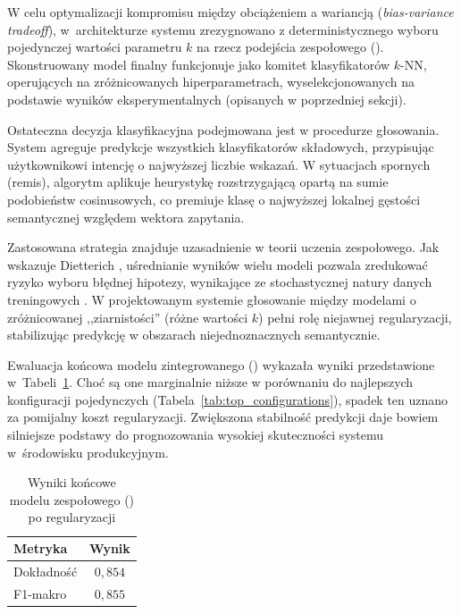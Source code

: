 W celu optymalizacji kompromisu między obciążeniem a wariancją (\textit{bias-variance tradeoff}), w~architekturze systemu  zrezygnowano z deterministycznego wyboru pojedynczej wartości parametru $k$ na rzecz podejścia zespołowego (). Skonstruowany model finalny funkcjonuje jako komitet klasyfikatorów $k$-NN, operujących na zróżnicowanych hiperparametrach, wyselekcjonowanych na podstawie wyników eksperymentalnych (opisanych w poprzedniej sekcji).

Ostateczna decyzja klasyfikacyjna podejmowana jest w procedurze głosowania. System agreguje predykcje wszystkich klasyfikatorów składowych, przypisując użytkownikowi intencję o najwyższej liczbie wskazań. W sytuacjach spornych (remis), algorytm aplikuje heurystykę rozstrzygającą opartą na sumie podobieństw cosinusowych, co premiuje klasę o najwyższej lokalnej gęstości semantycznej względem wektora zapytania.

Zastosowana strategia znajduje uzasadnienie w teorii uczenia zespołowego. Jak wskazuje Dietterich \cite{dietterich2000}, uśrednianie wyników wielu modeli pozwala zredukować ryzyko wyboru błędnej hipotezy, wynikające ze stochastycznej natury danych treningowych . W projektowanym systemie głosowanie między modelami o zróżnicowanej ,,ziarnistości'' (różne wartości $k$) pełni rolę niejawnej regularyzacji, stabilizując predykcję w obszarach niejednoznacznych semantycznie.

Ewaluacja końcowa modelu zintegrowanego () wykazała wyniki przedstawione w~Tabeli~\ref{tab:final_results}. Choć są one marginalnie niższe w porównaniu do najlepszych konfiguracji pojedynczych (Tabela~\ref{tab:top_configurations}), spadek ten uznano za pomijalny koszt regularyzacji. Zwiększona stabilność predykcji daje bowiem silniejsze podstawy do prognozowania wysokiej skuteczności systemu w~środowisku produkcyjnym.

\begin{table}[H]
    \centering
    \caption{Wyniki końcowe modelu zespołowego () po regularyzacji}
    \label{tab:final_results}
    \begin{tabular}{|l|c|}
        \hline
        \textbf{Metryka} & \textbf{Wynik} \\ 
        \hline
	    Dokładność & $0{,}854$ \\ 
        \hline
	    F1-makro & $0{,}855$ \\ 
        \hline
    \end{tabular}
\end{table}


